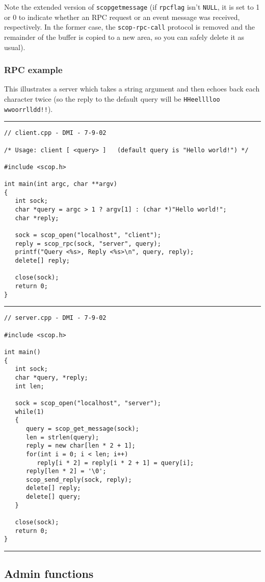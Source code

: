 \documentclass[12pt,a4paper,twoside]{article}
\renewcommand{\_}{\texttt{\symbol{95}}}
\newcommand{\codebar}{\rule{\textwidth}{0.3mm}}
\begin{document}
Note the extended version of \texttt{scop\_get\_message} (if
\texttt{rpc\_flag} isn't \texttt{NULL}, it is set to 1 or 0 to indicate
whether an RPC request or an event message was received, respectively.
In the former case, the \texttt{scop-rpc-call} protocol is removed and
the remainder of the buffer is copied to a new area, so you can safely
delete it as usual).

\subsubsection*{RPC example}

This illustrates a server which takes a string argument and
then echoes back each character twice (so the reply to the
default query will be \texttt{HHeelllloo  wwoorrlldd!!}).

\codebar
\small
\begin{verbatim}
// client.cpp - DMI - 7-9-02

/* Usage: client [ <query> ]   (default query is "Hello world!") */

#include <scop.h>

int main(int argc, char **argv)
{
   int sock;
   char *query = argc > 1 ? argv[1] : (char *)"Hello world!";
   char *reply;
   
   sock = scop_open("localhost", "client");
   reply = scop_rpc(sock, "server", query);
   printf("Query <%s>, Reply <%s>\n", query, reply);
   delete[] reply;
   
   close(sock);
   return 0;
}
\end{verbatim}
\normalsize
\codebar
\small
\begin{verbatim}
// server.cpp - DMI - 7-9-02

#include <scop.h>

int main()
{
   int sock;
   char *query, *reply;
   int len;
   
   sock = scop_open("localhost", "server");
   while(1)
   {
      query = scop_get_message(sock);
      len = strlen(query);
      reply = new char[len * 2 + 1];
      for(int i = 0; i < len; i++)
         reply[i * 2] = reply[i * 2 + 1] = query[i];
      reply[len * 2] = '\0';
      scop_send_reply(sock, reply);
      delete[] reply;
      delete[] query;
   }
   
   close(sock);
   return 0;
}
\end{verbatim}
\normalsize
\codebar

\subsection{Admin functions}
\end{document}

